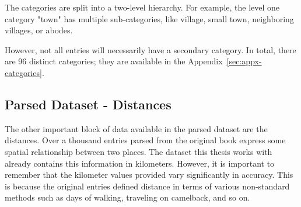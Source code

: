 The categories are split into a two-level hierarchy.
For example, the level one category "town" has multiple sub-categories, like
village, small town, neighboring villages, or abodes.

However, not all entries will necessarily have a secondary category.
In total, there are 96 distinct categories; they are available in the Appendix~\ref{sec:appx-categories}.

\subsection{Parsed Dataset - Distances}
The other important block of data available in the parsed dataset are the distances.
Over a thousand entries parsed from the original book express some spatial relationship
between two places.
The dataset this thesis works with already contains this information in kilometers. However, it is important
to remember that the kilometer values provided vary significantly in accuracy. This
is because the original entries defined distance in terms of various non-standard methods
such as days of walking, traveling on camelback, and so on.

